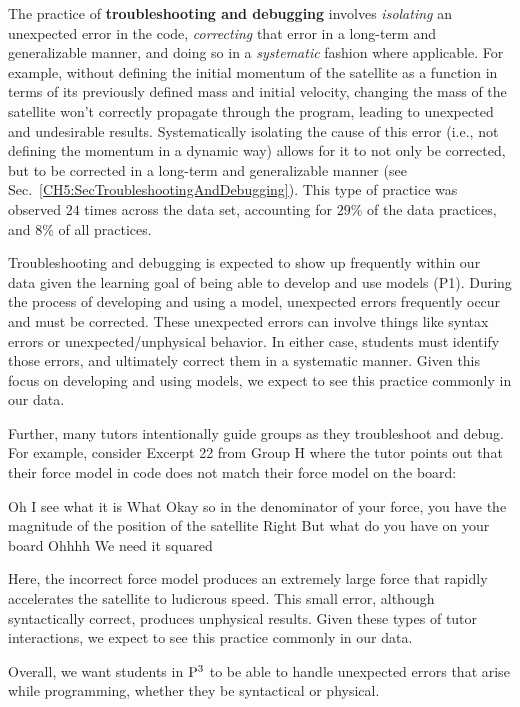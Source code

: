 \documentclass{msuphddissertation}
\begin{document}
\begin{doublespace}
The practice of \textbf{troubleshooting and debugging} involves \textit{isolating} an unexpected error in the code, \textit{correcting} that error in a long-term and generalizable manner, and doing so in a \textit{systematic} fashion where applicable.  For example, without defining the initial momentum of the satellite as a function in terms of its previously defined mass and initial velocity, changing the mass of the satellite won't correctly propagate through the program, leading to unexpected and undesirable results.  Systematically isolating the cause of this error (i.e., not defining the momentum in a dynamic way) allows for it to not only be corrected, but to be corrected in a long-term and generalizable manner (see Sec.~\ref{CH5:SecTroubleshootingAndDebugging}).  This type of practice was observed $24$ times across the data set, accounting for $29\%$ of the data practices, and $8\%$ of all practices.

Troubleshooting and debugging is expected to show up frequently within our data given the learning goal of being able to develop and use models (P1).  During the process of developing and using a model, unexpected errors frequently occur and must be corrected.  These unexpected errors can involve things like syntax errors or unexpected/unphysical behavior.  In either case, students must identify those errors, and ultimately correct them in a systematic manner.  Given this focus on developing and using models, we expect to see this practice commonly in our data.

Further, many tutors intentionally guide groups as they troubleshoot and debug.  For example, consider Excerpt 22 from Group H where the tutor points out that their force model in code does not match their force model on the board: \begin{description}
\TA Oh I see what it is
\SB What
\TA Okay so in the denominator of your force, you have the magnitude of the position of the satellite
\SB Right
\TA But what do you have on your board
\SB Ohhhh
\SC We need it squared
\end{description}  Here, the incorrect force model produces an extremely large force that rapidly accelerates the satellite to ludicrous speed.  This small error, although syntactically correct, produces unphysical results.  Given these types of tutor interactions, we expect to see this practice commonly in our data.

Overall, we want students in ${\rm P}^{3}$ to be able to handle unexpected errors that arise while programming, whether they be syntactical or physical.


\end{doublespace}
\end{document}
